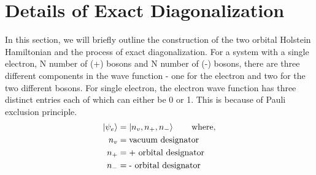 \documentclass{article}
\begin{document}
\section{Details of Exact Diagonalization}
In this section, we will briefly outline the construction of the two orbital Holstein Hamiltonian and the process of exact diagonalization. For a system with a single electron, N number of (+) bosons and N number of (-) bosons, there are three different components in the wave function - one for the electron and two for the two different bosons. For single electron, the electron wave function has three distinct entries each of which can either be 0 or 1. This is because of Pauli exclusion principle.
\begin{equation}
\begin{aligned}
    \ket{\psi_e} &=\ket{n_v, n_+, n_-} \qquad \text{where,}\\
    n_v &= \text{vacuum designator}\\
    n_+ &= \text{+ orbital designator}\\
    n_- &= \text{- orbital designator}\\
\end{aligned}
\end{equation}
\end{document}
